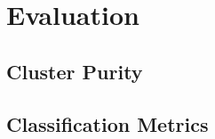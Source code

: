 \chapter{Evaluation}\label{chap:evaluation}
\section{Cluster Purity}
\section{Classification Metrics}